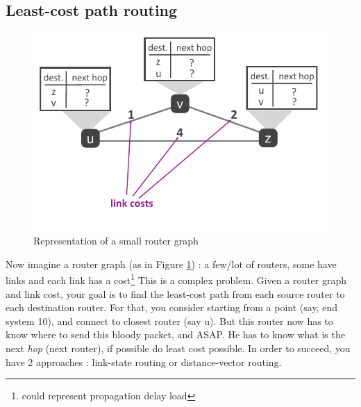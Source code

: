 \documentclass[12pt,a4paper]{article}
\begin{document}
\subsection{Least-cost path routing}
\begin{figure}[h]
	\centering
	\includegraphics[scale=0.5]{images/router_graph}
	\caption{Representation of a small router graph}
	\label{fig: router graph}
\end{figure}
Now imagine a router graph (as in Figure \ref{fig: router graph}) : a few/lot of routers, some have links and each link has a cost\footnote{could represent propagation delay load}
This is a complex problem. Given a router graph and link cost, your goal is to find the least-cost path from each source router to each destination router. For that, you consider starting from a point (say, end system 10), and connect to closest router (say u). But this router now has to know where to send this bloody packet, and ASAP. He has to know what is the next \textit{hop} (next router), if possible do least cost possible. In order to succeed, you have 2 approaches : link-state routing or distance-vector routing.
\end{document}
